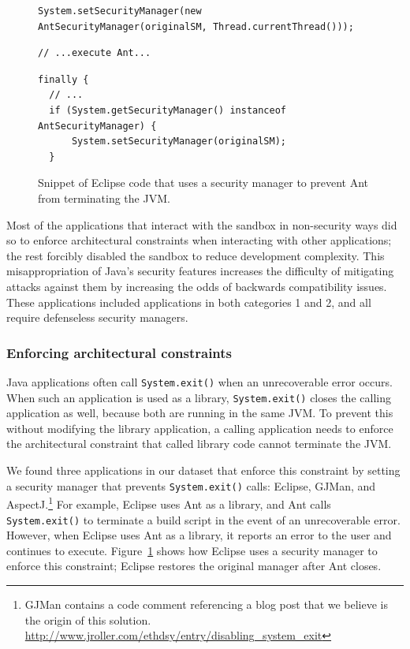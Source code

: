 \documentclass{sig-alternate-05-2015}
\begin{document}
\begin{figure}
\begin{lstlisting}[firstnumber=691]
System.setSecurityManager(new AntSecurityManager(originalSM, Thread.currentThread()));
\end{lstlisting}
\vspace{-0.3cm}
\begin{lstlisting}[firstnumber=703]
// ...execute Ant...
\end{lstlisting}
\vspace{-0.3cm}
\begin{lstlisting}[firstnumber=723]
finally {
  // ...
  if (System.getSecurityManager() instanceof AntSecurityManager) { 
      System.setSecurityManager(originalSM); 
  }
\end{lstlisting}\vspace{-0.3cm}
\caption{Snippet of Eclipse code that uses a security manager to prevent Ant\label{fig:Eclipse-snippet}
from terminating the JVM.}
\end{figure}

Most of the applications that interact with the sandbox in
non-security ways did so to enforce architectural constraints when interacting with
other applications; the rest forcibly disabled the sandbox to reduce development
complexity. This misappropriation
of Java's security features increases the difficulty of mitigating attacks against
them by increasing the odds of backwards compatibility issues.  These applications
included applications in both categories 1 and 2, and all require defenseless security managers.

\subsubsection{Enforcing architectural constraints}

Java applications often call \texttt{System.exit()} when an unrecoverable
error occurs. When such an application is 
used as a library, \texttt{System.exit()} closes the calling
application as well, because both 
are running in the same JVM. 
To prevent this without modifying the library application,
a calling application needs to enforce the architectural constraint
that called library code cannot terminate the JVM. 

We found three applications in our dataset that 
enforce this constraint by setting a security manager
that prevents \texttt{System.exit()} calls:
Eclipse, GJMan, and AspectJ.\footnote{%
GJMan contains a code comment referencing a
blog post that we believe is the origin of this solution. \url{http://www.jroller.com/ethdsy/entry/disabling_system_exit}}
For example, Eclipse uses Ant as a library, and Ant calls \texttt{System.exit()} to
terminate a build script in the event of an unrecoverable
error.  However, when Eclipse uses Ant as a library, it
reports an error to the user and continues to execute. 
Figure~\ref{fig:Eclipse-snippet} shows
how Eclipse uses a security manager to enforce this constraint; Eclipse restores
the original manager after Ant closes.
\end{document}
